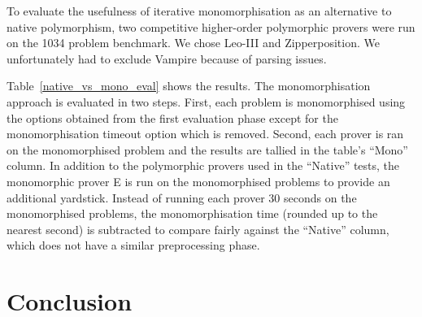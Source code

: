 \documentclass[runningheads]{llncs}
\begin{document}
To evaluate the usefulness of iterative monomorphisation as an alternative to native polymorphism, two competitive higher-order polymorphic provers were run on the 1034 problem benchmark. We chose Leo-III and Zipperposition. We unfortunately had to exclude Vampire because of parsing issues.

Table~\ref{native_vs_mono_eval} shows the results.
The monomorphisation approach is evaluated in two steps. First, each problem is monomorphised using the options obtained from the first evaluation phase except for the monomorphisation timeout option which is removed. Second, each prover is ran on the monomorphised problem and the results are tallied in the table's ``Mono'' column. In addition to the polymorphic provers used in the ``Native'' tests, the monomorphic prover E is run on the monomorphised problems to provide an additional yardstick. Instead of running each prover 30 seconds on the monomorphised problems, the monomorphisation time (rounded up to the nearest second) is subtracted to compare fairly against the ``Native'' column, which does not have a similar preprocessing phase.

%
%
%    

\section{Conclusion}
\label{sec:conclusion}
\end{document}
